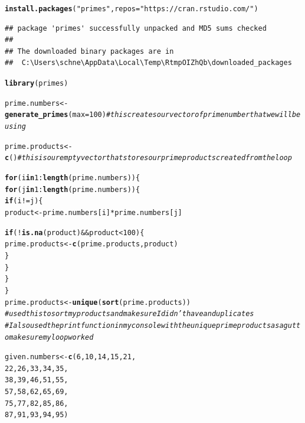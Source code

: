 \documentclass{article}\usepackage[]{graphicx}\usepackage[]{xcolor}
\makeatletter
\newcommand{\hlnum}[1]{\textcolor[rgb]{0.686,0.059,0.569}{#1}}%
\newcommand{\hlsng}[1]{\textcolor[rgb]{0.192,0.494,0.8}{#1}}%
\newcommand{\hlcom}[1]{\textcolor[rgb]{0.678,0.584,0.686}{\textit{#1}}}%
\newcommand{\hlopt}[1]{\textcolor[rgb]{0,0,0}{#1}}%
\newcommand{\hldef}[1]{\textcolor[rgb]{0.345,0.345,0.345}{#1}}%
\newcommand{\hlkwa}[1]{\textcolor[rgb]{0.161,0.373,0.58}{\textbf{#1}}}%
\newcommand{\hlkwb}[1]{\textcolor[rgb]{0.69,0.353,0.396}{#1}}%
\newcommand{\hlkwc}[1]{\textcolor[rgb]{0.333,0.667,0.333}{#1}}%
\newcommand{\hlkwd}[1]{\textcolor[rgb]{0.737,0.353,0.396}{\textbf{#1}}}%
\newenvironment{kframe}{%
 \def\at@end@of@kframe{}%
 \ifinner\ifhmode%
  \def\at@end@of@kframe{\end{minipage}}%
  \begin{minipage}{\columnwidth}%
 \fi\fi%
 \def\FrameCommand##1{\hskip\@totalleftmargin \hskip-\fboxsep
 \colorbox{shadecolor}{##1}\hskip-\fboxsep
     \hskip-\linewidth \hskip-\@totalleftmargin \hskip\columnwidth}%
 \MakeFramed {\advance\hsize-\width
   \@totalleftmargin\z@ \linewidth\hsize
   \@setminipage}}%
 {\par\unskip\endMakeFramed%
 \at@end@of@kframe}
\newenvironment{knitrout}{}{} %
\makeatother
\begin{document}
\begin{enumerate}
\begin{knitrout}\scriptsize
{}\color{fgcolor}\begin{kframe}
\begin{alltt}
\hlkwd{install.packages}\hldef{(}\hlsng{"primes"}\hldef{,} \hlkwc{repos}\hldef{=} \hlsng{"https://cran.rstudio.com/"}\hldef{)}
\end{alltt}
\begin{verbatim}
## package 'primes' successfully unpacked and MD5 sums checked
## 
## The downloaded binary packages are in
## 	C:\Users\schne\AppData\Local\Temp\RtmpOIZhQb\downloaded_packages
\end{verbatim}
\begin{alltt}
\hlkwd{library}\hldef{(primes)}

\hldef{prime.numbers} \hlkwb{<-} \hlkwd{generate_primes}\hldef{(}\hlkwc{max} \hldef{=} \hlnum{100}\hldef{)} \hlcom{#this creates our vector of prime number that we will be using}



\hldef{prime.products} \hlkwb{<-} \hlkwd{c}\hldef{()} \hlcom{#this is our empty vector that stores our prime products created from the loop }

\hlkwa{for} \hldef{(i} \hlkwa{in} \hlnum{1}\hlopt{:}\hlkwd{length}\hldef{(prime.numbers)) \{}
  \hlkwa{for} \hldef{(j} \hlkwa{in} \hlnum{1}\hlopt{:}\hlkwd{length}\hldef{(prime.numbers)) \{}
    \hlkwa{if}\hldef{( i} \hlopt{!=} \hldef{j)\{}
      \hldef{product} \hlkwb{<-} \hldef{prime.numbers[i]} \hlopt{*} \hldef{prime.numbers[j]}

      \hlkwa{if} \hldef{(}\hlopt{!}\hlkwd{is.na}\hldef{(product)} \hlopt{&&} \hldef{product} \hlopt{<} \hlnum{100}\hldef{) \{}
        \hldef{prime.products} \hlkwb{<-} \hlkwd{c}\hldef{(prime.products, product)}
      \hldef{\}}
    \hldef{\}}
  \hldef{\}}
\hldef{\}}
\hldef{prime.products} \hlkwb{<-} \hlkwd{unique}\hldef{(}\hlkwd{sort}\hldef{(prime.products))}
\hlcom{#used this to sort my products and make sure I didn't have an duplicates}
\hlcom{#I also used the print function in my console with the unique prime products as a gut to make sure my loop worked}

\hldef{given.numbers} \hlkwb{<-} \hlkwd{c}\hldef{(} \hlnum{6}\hldef{,} \hlnum{10}\hldef{,} \hlnum{14}\hldef{,} \hlnum{15}\hldef{,} \hlnum{21}\hldef{,}
                    \hlnum{22}\hldef{,} \hlnum{26}\hldef{,} \hlnum{33}\hldef{,} \hlnum{34}\hldef{,} \hlnum{35}\hldef{,}
                    \hlnum{38}\hldef{,} \hlnum{39}\hldef{,} \hlnum{46}\hldef{,} \hlnum{51}\hldef{,} \hlnum{55}\hldef{,}
                    \hlnum{57}\hldef{,} \hlnum{58}\hldef{,} \hlnum{62}\hldef{,} \hlnum{65}\hldef{,} \hlnum{69}\hldef{,}
                    \hlnum{75}\hldef{,} \hlnum{77}\hldef{,} \hlnum{82}\hldef{,} \hlnum{85}\hldef{,} \hlnum{86}\hldef{,}
                    \hlnum{87}\hldef{,} \hlnum{91}\hldef{,} \hlnum{93}\hldef{,} \hlnum{94}\hldef{,} \hlnum{95}\hldef{)}


\end{alltt}
\end{kframe}
\end{knitrout}
\end{enumerate}
\end{document}
